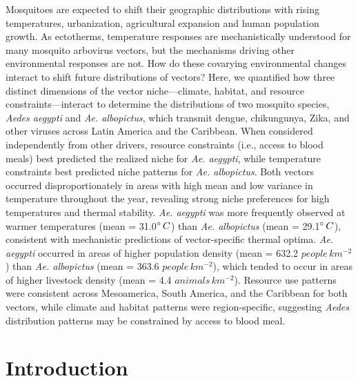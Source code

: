 Mosquitoes are expected to shift their geographic distributions with rising temperatures, urbanization, agricultural expansion and human population growth. As ectotherms, temperature responses are mechanistically understood for many mosquito arbovirus vectors, but the mechanisms driving other environmental responses are not. How do these covarying environmental changes interact to shift future distributions of vectors? Here, we quantified how three distinct dimensions of the vector niche—climate, habitat, and resource constraints—interact to determine the distributions of two mosquito species, \textit{Aedes aegypti} and \textit{Ae. albopictus}, which transmit dengue, chikungunya, Zika, and other viruses across Latin America and the Caribbean. When considered independently from other drivers, resource constraints (i.e., access to blood meals) best predicted the realized niche for \textit{Ae. aegypti}, while temperature constraints best predicted niche patterns for \textit{Ae. albopictus}. Both vectors occurred disproportionately in areas with high mean and low variance in temperature throughout the year, revealing strong niche preferences for high temperatures and thermal stability. \textit{Ae. aegypti} was more frequently observed at warmer temperatures (mean = 31.0$\degree\, C$) than \textit{Ae. albopictus} (mean = 29.1$\degree\, C$), consistent with mechanistic predictions of vector-specific thermal optima. \textit{Ae. aegypti} occurred in areas of higher population density (mean = 632.2 $people\, km^{-2}$) than \textit{Ae. albopictus} (mean = 363.6 $people\, km^{-2}$), which tended to occur in areas of higher livestock density (mean = 4.4 $animals\, km^{-2}$). Resource use patterns were consistent across Mesoamerica, South America, and the Caribbean for both vectors, while climate and habitat patterns were region-specific, suggesting \textit{Aedes} distribution patterns may be constrained by access to blood meal.

\section{Introduction}

